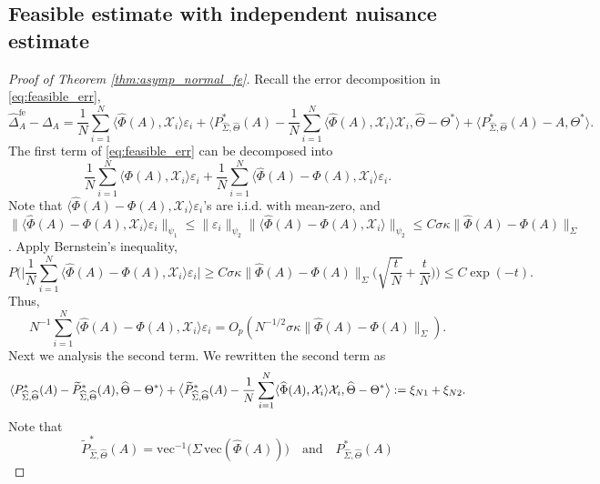 \documentclass[authoryear,preprint,review,12pt]{elsarticle}
\begin{document}
\subsection{Feasible estimate with independent nuisance estimate}


\begin{proof}[Proof of Theorem \ref{thm:asymp_normal_fe}]
	Recall the error decomposition in \eqref{eq:feasible_err}, 
	\[	\widehat{\Delta}_A^{\mathrm{fe}} - {\Delta}_A  = \frac{1}{N} \sum_{i=1}^N \langle \widehat{\Phi}(A), \mathcal{X}_i \rangle \varepsilon_i
	+ \big\langle P_{\widehat{\Sigma},\widehat{\Theta}}^\ast(A) -  \frac{1}{N} \sum_{i=1}^N  \langle  \widehat{\Phi}(A), \mathcal{X}_i \rangle     \mathcal{X}_i,  \widehat{\Theta} - \Theta^\ast\big\rangle + \langle   P_{\widehat{\Sigma},\widehat{\Theta}}^\ast(A) - A, \Theta^\ast\rangle.\] 
	The first term of \eqref{eq:feasible_err} can be decomposed into
	\[\frac{1}{N} \sum_{i=1}^N \langle  {\Phi}(A), \mathcal{X}_i \rangle \varepsilon_i + \frac{1}{N} \sum_{i=1}^N \langle \widehat{\Phi}(A) - {\Phi}(A), \mathcal{X}_i \rangle \varepsilon_i. \]
	Note that $\langle \widehat{\Phi}(A) - \Phi(A), \mathcal{X}_i \rangle \varepsilon_i$'s are i.i.d. with mean-zero, and $\|\langle \widehat{\Phi}(A) - \Phi(A), \mathcal{X}_i \rangle \varepsilon_i\|_{\psi_1}\leq \|\varepsilon_i\|_{\psi_2} \|\langle \widehat{\Phi}(A) - \Phi(A), \mathcal{X}_i \rangle\|_{\psi_2} \leq  C\sigma\kappa \|\widehat{\Phi}(A) - \Phi(A)\|_{\Sigma} $. Apply Bernstein's inequality,
	\[
	P\Big( \Big| \frac{1}{N} \sum_{i=1}^N \langle \widehat{\Phi}(A) - {\Phi}(A), \mathcal{X}_i \rangle \varepsilon_i \Big| \geq C\sigma \kappa \|\widehat{\Phi}(A) - {\Phi}(A)\|_{\Sigma}  \Big(\sqrt{\frac{t}{N}} + \frac{t}{N}\Big)    \Big)\leq C\exp(-t).
	\]
	Thus, 
	\[
	N^{-1}\sum_{i=1}^N \langle \widehat{\Phi}(A) - {\Phi}(A), \mathcal{X}_i \rangle \varepsilon_i =O_p(N^{-1/2}\sigma\kappa \|\widehat{\Phi}(A) - {\Phi}(A)\|_{\Sigma}  ).
	\] 
	Next we analysis the second term. We rewritten the second term as
	\[
	\langle   P_{\widehat{\Sigma},\widehat{\Theta}}^\ast(A) - \widetilde P_{\widehat{\Sigma},\widehat{\Theta}}^\ast(A) , \widehat\Theta - \Theta^\ast\rangle + 	\big\langle \widetilde P_{\widehat{\Sigma},\widehat{\Theta}}^\ast(A) -  \frac{1}{N} \sum_{i=1}^N  \langle  \widehat{\Phi}(A), \mathcal{X}_i \rangle     \mathcal{X}_i,  \widehat{\Theta} - \Theta^\ast\big\rangle :=\xi_{N1} + \xi_{N2} .
	\]
	Note that  
	\[\widetilde P_{\widehat{\Sigma},\widehat{\Theta}}^\ast(A)
	= \mathrm{vec}^{-1}\!\big({\Sigma}\,\mathrm{vec}(\widehat{\Phi}(A))\big)\quad \text{and} \quad  P_{\widehat{\Sigma},\widehat{\Theta}}^\ast(A)
\]
\end{proof}
\end{document}
